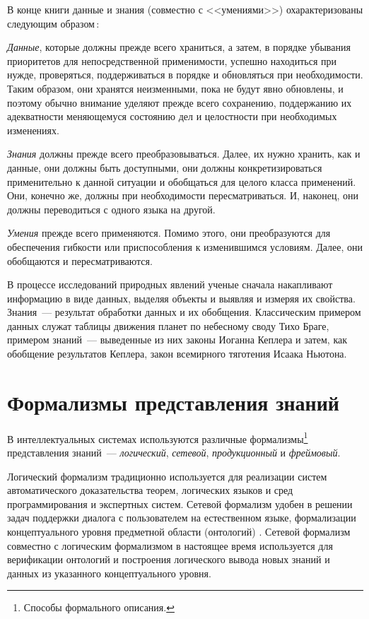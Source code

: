 \documentclass[a4paper,14pt, openany, twoside, draft]{extbook} %
\begin{document}
В конце книги \cite{DDWII} данные и знания (совместно с <<умениями>>) охарактеризованы следующим образом\,:

{\em Данные}, которые должны прежде всего храниться, а затем, в порядке убывания приоритетов для непосредственной применимости, успешно находиться при нужде, проверяться, поддерживаться в порядке и обновляться при необходимости. Таким образом, они хранятся неизменными, пока не будут явно обновлены, и поэтому обычно внимание уделяют прежде всего сохранению, поддержанию их адекватности меняющемуся состоянию дел и целостности при необходимых изменениях.

{\em Знания} должны прежде всего преобразовываться. Далее, их нужно хранить, как и данные, они должны быть доступными, они должны конкретизироваться применительно к данной ситуации и обобщаться для целого класса применений. Они, конечно же, должны при необходимости пересматриваться. И, наконец, они должны переводиться с одного языка на другой.

{\em Умения} прежде всего применяются. Помимо этого, они преобразуются для обеспечения гибкости или приспособления к изменившимся условиям. Далее, они обобщаются и пересматриваются.

В процессе исследований природных явлений ученые сначала накапливают информацию в виде данных, выделяя объекты и выявляя и измеряя их свойства.  Знания~--- результат обработки данных и их обобщения.  Классическим примером данных служат таблицы движения планет по небесному своду Тихо Браге, примером знаний~--- выведенные из них законы Иоганна Кеплера и затем, как обобщение результатов Кеплера, закон всемирного тяготения Исаака Ньютона.

\section{Формализмы представления знаний}
\label{sec:knowlege_repr}

В интеллектуальных системах используются различные формализмы\footnote{Способы формального описания.} представления знаний~--- {\em логический}, {\em сетевой}, {\em продукционный} и {\em фреймовый}.

Логический формализм традиционно используется для реализации систем автоматического доказательства теорем, логических языков и сред программирования и экспертных систем.  Сетевой формализм удобен в решении задач поддержки диалога с пользователем на естественном языке, формализации концептуального уровня предметной области (онтологий) \cite{ontodef}.  Сетевой формализм совместно с логическим формализмом в настоящее время используется для верификации онтологий и построения логического вывода новых знаний и данных из указанного концептуального уровня.
\end{document}
